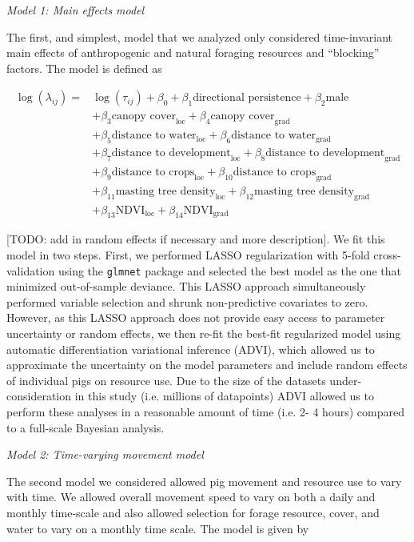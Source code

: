 \documentclass[a4paper]{article}
\begin{document}
\noindent
\emph{Model 1: Main effects model}

The first, and simplest, model that we analyzed only considered time-invariant main effects of anthropogenic and natural foraging resources and ``blocking'' factors.  The model is defined as

\begin{align}
  \log(\lambda_{ij}) = & \log(\tau_{ij}) + \beta_0 +  \beta_1 \text{directional persistence} + \beta_2 \text{male  } \\
  & + \beta_{3} \text{canopy cover}_{\text{loc}} + \beta_{4} \text{canopy cover}_{\text{grad}} \\
  & + \beta_5 \text{distance to water}_{\text{loc}} + \beta_6 \text{distance to water}_{\text{grad}} \\
  & + \beta_7 \text{distance to development}_{\text{loc}} + \beta_8 \text{distance to development}_{\text{grad}} \\
  & + \beta_9\text{distance to crops}_{\text{loc}} + \beta_{10}\text{distance to crops}_{\text{grad}} \\
  & + \beta_{11}\text{masting tree density}_{\text{loc}} + \beta_{12}\text{masting tree density}_{\text{grad}} \\
  & + \beta_{13}\text{NDVI}_{\text{loc}} + \beta_{14}\text{NDVI}_{\text{grad}}
\end{align}

[TODO: add in random effects if necessary and more description].  We fit this model in two steps.  First, we performed LASSO regularization with 5-fold cross-validation using the \texttt{glmnet} package and selected the best model as the one that minimized out-of-sample deviance.  This LASSO approach simultaneously performed variable selection and shrunk non-predictive covariates to zero.  However, as this LASSO approach does not provide easy access to parameter uncertainty or random effects, we then re-fit the best-fit regularized model using automatic differentiation variational inference (ADVI), which allowed us to approximate the uncertainty on the model parameters and include random effects of individual pigs on resource use.  Due to the size of the datasets under-consideration in this study (i.e. millions of datapoints) ADVI allowed us to perform these analyses in a reasonable amount of time (i.e. 2- 4 hours) compared to a full-scale Bayesian analysis.

\noindent
\emph{Model 2: Time-varying movement model}

The second model we considered allowed pig movement and resource use to vary with time. We allowed overall movement speed to vary on both a daily and monthly time-scale and also allowed selection for forage resource, cover, and water to vary on a monthly time scale.  The model is given by
\end{document}
